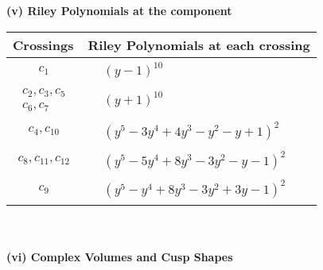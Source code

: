 \documentclass[1p]{elsarticle_modified}
\theoremstyle{definition}
\begin{document}
\newpage\renewcommand{\arraystretch}{1}
\flushleft \textbf{(v) Riley Polynomials at the component}\newline \\
\begin{tabular}{m{50pt}|m{274pt}}
Crossings & \hspace{64pt}Riley Polynomials at each crossing \\
\hline $$\begin{aligned}c_{1}\end{aligned}$$&$\begin{aligned}
&(y-1)^{10}
\end{aligned}$\\
\hline $$\begin{aligned}c_{2},c_{3},c_{5}\\c_{6},c_{7}\end{aligned}$$&$\begin{aligned}
&(y+1)^{10}
\end{aligned}$\\
\hline $$\begin{aligned}c_{4},c_{10}\end{aligned}$$&$\begin{aligned}
&(y^5-3 y^4+4 y^3- y^2- y+1)^2
\end{aligned}$\\
\hline $$\begin{aligned}c_{8},c_{11},c_{12}\end{aligned}$$&$\begin{aligned}
&(y^5-5 y^4+8 y^3-3 y^2- y-1)^2
\end{aligned}$\\
\hline $$\begin{aligned}c_{9}\end{aligned}$$&$\begin{aligned}
&(y^5- y^4+8 y^3-3 y^2+3 y-1)^2
\end{aligned}$\\
\hline
\end{tabular}\\~\\
\newpage\flushleft \textbf{(vi) Complex Volumes and Cusp Shapes}
\end{document}
